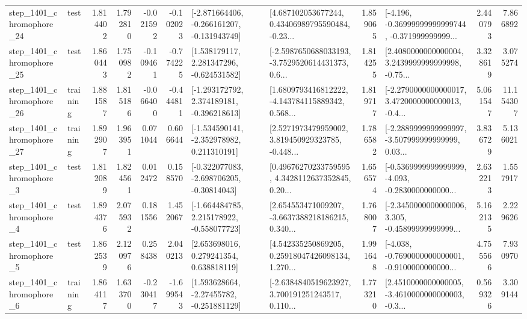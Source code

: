 \begin{tabular}{llrrrrllrlrr}
 step\_1401\_chromophore\_24 &      test &      1.814402 &    1.792810 &     -0.021592 & -0.102023 &  [-2.871664406, -0.266161207, -0.131943749] &  [4.687102053677244, 0.43406989795590484, -0.23... &       1.859065 &  [-4.196, -0.36999999999999744, -0.371999999999... &            2.440793 &          7.866892 \\
 step\_1401\_chromophore\_25 &      test &      1.860443 &    1.750982 &     -0.109461 & -0.774225 &    [1.538179117, 2.281347296, -0.624531582] &  [-2.5987650688033193, -3.7529520614431373, 0.6... &       1.814255 &  [2.4080000000000004, 3.2439999999999998, -0.75... &            3.328619 &          3.075274 \\
 step\_1401\_chromophore\_26 &  training &      1.881587 &    1.815186 &     -0.066400 & -0.444811 &   [-1.293172792, 2.374189181, -0.396218613] &  [1.6809793416812222, -4.143784115889342, 0.568... &       1.819717 &  [-2.2790000000000017, 3.4720000000000013, -0.4... &            5.061547 &         11.154307 \\
 step\_1401\_chromophore\_27 &  training &      1.892907 &    1.963951 &      0.071044 &  0.606644 &   [-1.534590141, -2.352978982, 0.211310191] &  [2.5271973479959002, 3.819450929323785, -0.448... &       1.786582 &  [-2.2889999999999997, -3.507999999999999, 0.03... &            3.836729 &          5.136021 \\
  step\_1401\_chromophore\_3 &      test &      1.812089 &    1.824561 &      0.012472 &  0.158570 &   [-0.322077083, -2.698706205, -0.30814043] &  [0.49676270233759595, 4.3428112637352845, 0.20... &       1.656574 &  [-0.5369999999999999, -4.093, -0.2830000000000... &            2.632213 &          1.557917 \\
  step\_1401\_chromophore\_4 &      test &      1.894376 &    2.075932 &      0.181556 &  1.452067 &   [-1.664484785, 2.215178922, -0.558077723] &  [2.654553471009207, -3.6637388218186215, 0.340... &       1.768007 &  [-2.3450000000000006, 3.305, -0.45899999999999... &            5.162135 &          2.229626 \\
  step\_1401\_chromophore\_5 &      test &      1.862539 &    2.120976 &      0.258438 &  2.040213 &     [2.653698016, 0.279241354, 0.638818119] &  [4.542335250869205, 0.25918047426098134, 1.270... &       1.991648 &  [-4.038, -0.7690000000000001, -0.9100000000000... &            4.755566 &          7.930970 \\
  step\_1401\_chromophore\_6 &  training &      1.864117 &    1.633700 &     -0.230417 & -1.699543 &    [1.593628664, -2.27455782, -0.251881129] &  [-2.6384840519623927, 3.700191251243517, 0.110... &       1.773210 &  [2.4510000000000005, -3.4610000000000003, -0.3... &            0.569326 &          3.309144 \\

\end{tabular}
